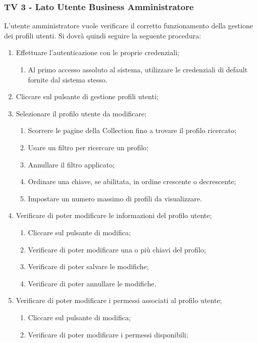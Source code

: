 \subsubsection{TV 3 - Lato Utente Business Amministratore}

L’utente amministratore vuole verificare il corretto funzionamento della gestione dei profili utenti.
Si dovrà quindi seguire la seguente procedura:

\begin{enumerate}
\item Effettuare l'autenticazione con le proprie credenziali;
\begin{enumerate}
\item Al primo accesso assoluto al sistema, utilizzare le credenziali di default fornite dal sistema stesso.
\end{enumerate}
\item Cliccare sul pulsante di gestione profili utenti;
\item Selezionare il profilo utente da modificare;
\begin{enumerate}
\item Scorrere le pagine della Collection fino a trovare il profilo ricercato;
\item Usare un filtro per ricercare un profilo;
\item Annullare il filtro applicato;
\item Ordinare una chiave, se abilitata, in ordine crescente o decrescente;
\item Impostare un numero massimo di profili da visualizzare.
\end{enumerate}
\item Verificare di poter modificare le informazioni del profilo utente;
\begin{enumerate}
\item Cliccare sul pulsante di modifica;
\item Verificare di poter modificare una o più chiavi del profilo;
\item Verificare di poter salvare le modifiche;
\item Verificare di poter annullare le modifiche.
\end{enumerate}
\item Verificare di poter modificare i permessi associati al profilo utente;
\begin{enumerate}
\item Cliccare sul pulsante di modifica;
\item Verificare di poter modificare i permessi disponibili;

\end{enumerate}
\end{enumerate}
